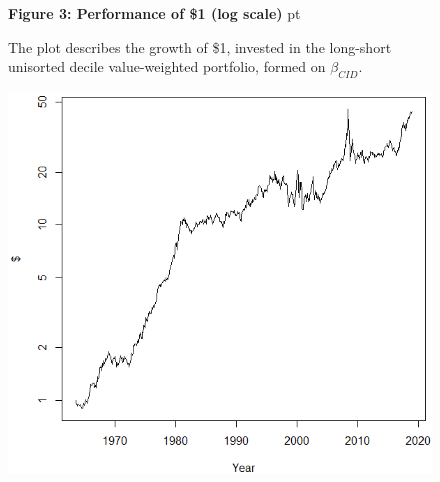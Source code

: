 \documentclass[12pt]{article}
\begin{document}
\begin{figure}
\textbf{Figure 3: Performance of \$1 (log scale)}
 pt
\begin{flushleft}
{The plot describes the growth of \$1, invested in the long-short unisorted decile value-weighted portfolio, formed on $\beta_{CID}$.}
\end{flushleft}
\centering
\includegraphics[width=1\textwidth]{Figure3.png}
\end{figure}
\end{document}
